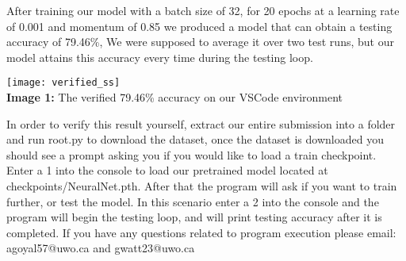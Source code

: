 \documentclass[]{report}
\begin{document}
After training our model with a batch size of 32, for 20 epochs at a learning rate of 0.001 and momentum of 0.85 we produced a model that can obtain a testing accuracy of 79.46\%, We were supposed to average it over two test runs, but our model attains this accuracy every time during the testing loop.

\begin{center}
	
	\texttt{[image: verified\_ss]} \\ 
	\vspace{1em}
	\textbf{Image 1:} The verified 79.46\% accuracy on our VSCode environment
	
\end{center}

In order to verify this result yourself, extract our entire submission into a folder and run root.py to download the dataset, once the dataset is downloaded you should see a prompt asking you if you would like to load a train checkpoint. Enter a 1 into the console to load our pretrained model located at checkpoints/NeuralNet.pth. After that the program will ask if you want to train further, or test the model. In this scenario enter a 2 into the console and the program will begin the testing loop, and will print testing accuracy after it is completed. If you have any questions related to program execution please email: agoyal57@uwo.ca and gwatt23@uwo.ca 
\end{document}
